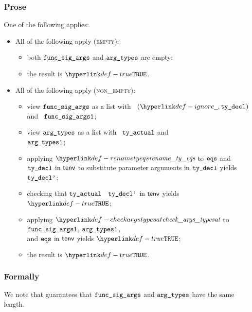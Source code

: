 \subsubsection{Prose}
One of the following applies:
\begin{itemize}
  \item All of the following apply (\textsc{empty}):
  \begin{itemize}
    \item both $\texttt{func\_sig\_args}$ and $\texttt{arg\_types}$ are empty;
    \item the result is $\True$.
  \end{itemize}

  \item All of the following apply (\textsc{non\_empty}):
  \begin{itemize}
    \item view $\texttt{func\_sig\_args}$ as a list with \head\ $(\Ignore, \tydecl)$ and \tail\ $\texttt{func\_sig\_args1}$;
    \item view $\texttt{arg\_types}$ as a list with \head\ $\texttt{ty\_actual}$ and \tail\ \\
          $\texttt{arg\_types1}$;
    \item applying $\renametyeqs$ to $\texttt{eqs}$ and $\texttt{ty\_decl}$ in $\textsf{tenv}$
          to substitute parameter arguments in $\texttt{ty\_decl}$ yields $\texttt{ty\_decl'}$\ProseOrTypeError;
    \item checking that $\texttt{ty\_actual}$ \typesatisfies\ $\texttt{ty\_decl'}$ in $\textsf{tenv}$ yields $\True$\ProseOrTypeError;
    \item applying $\checkargstypesat$ to $\texttt{func\_sig\_args1}$, $\texttt{arg\_types1}$, \\
          and $\texttt{eqs}$ in $\textsf{tenv}$
          yields $\True$\ProseOrTypeError;
    \item the result is $\True$.
  \end{itemize}
\end{itemize}

\subsubsection{Formally}
We note that  guarantees
that $\texttt{func\_sig\_args}$ and $\texttt{arg\_types}$ have the same length.


